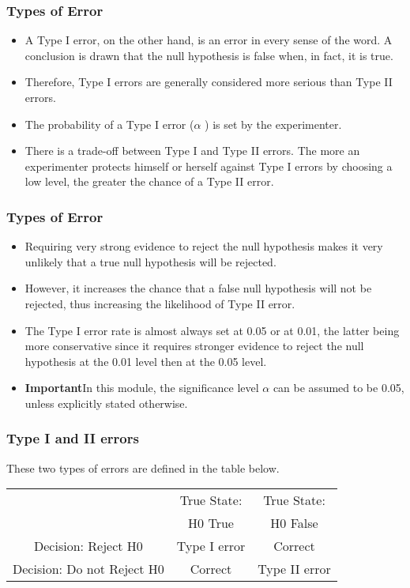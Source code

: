 \documentclass[a4]{beamer}
\begin{document}
\begin{frame}
	\frametitle{Types of Error}
	\large
	\begin{itemize}
		\item
		A Type I error, on the other hand, is an error in every sense of the word. A conclusion is drawn that the null hypothesis is false when, in fact, it is true. \item Therefore, Type I errors are generally considered more serious than Type II errors.
		\item
		The probability of a Type I error ($\alpha$ ) is set by the experimenter. \item There is a trade-off between Type I and Type II errors. The more an experimenter protects himself or herself against Type I errors by choosing a low level, the greater the chance of a Type II error.
	\end{itemize}
\end{frame}
\begin{frame}
	\frametitle{Types of Error}
	\large
	\begin{itemize}
		\item
		Requiring very strong evidence to reject the null hypothesis makes it very unlikely that a true null hypothesis will be rejected. \item However, it increases the chance that a false null hypothesis will not be rejected, thus increasing the likelihood of Type II error.
		\item
		The Type I error rate is almost always set at 0.05 or at 0.01, the latter being more conservative since it requires stronger evidence to reject the null hypothesis at the 0.01 level then at the 0.05 level.
		\item \textbf{Important}In this module, the significance level $\alpha$ can be assumed to be 0.05, unless explicitly stated otherwise.
	\end{itemize}
\end{frame}
\begin{frame}
	\frametitle{Type I and II errors}
	\large
	These two types of errors are defined in the table below.
\Large
	\begin{center}
		\begin{tabular}{|c|c|c|}
			\hline
			& True State:  & True State: \\
			& H0 True & H0 False \\
			
			\hline
			Decision: Reject H0 & Type I error& Correct\\\hline
			Decision: Do not Reject H0 & Correct &Type II error\\ \hline
		\end{tabular}
	\end{center}
\end{frame}
\end{document}
